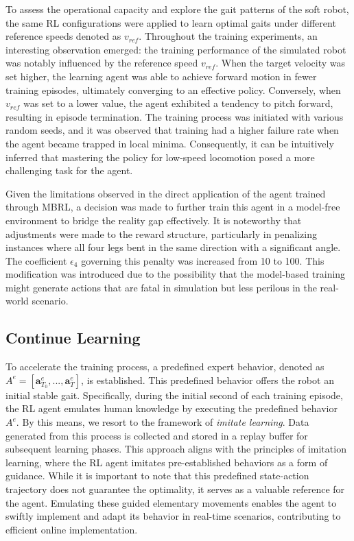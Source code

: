 To assess the operational capacity and explore the gait patterns of the soft robot, the same RL configurations were applied to learn optimal gaits under different reference speeds denoted as $v_{ref}$. Throughout the training experiments, an interesting observation emerged: the training performance of the simulated robot was notably influenced by the reference speed $v_{ref}$. When the target velocity was set higher, the learning agent was able to achieve forward motion in fewer training episodes, ultimately converging to an effective policy. Conversely, when $v_{ref}$ was set to a lower value, the agent exhibited a tendency to pitch forward, resulting in episode termination. The training process was initiated with various random seeds, and it was observed that training had a higher failure rate when the agent became trapped in local minima. Consequently, it can be intuitively inferred that mastering the policy for low-speed locomotion posed a more challenging task for the agent.

Given the limitations observed in the direct application of the agent trained through MBRL, a decision was made to further train this agent in a model-free environment to bridge the reality gap effectively. It is noteworthy that adjustments were made to the reward structure, particularly in penalizing instances where all four legs bent in the same direction with a significant angle. The coefficient $\epsilon_4$ governing this penalty was increased from 10 to 100. This modification was introduced due to the possibility that the model-based training might generate actions that are fatal in simulation but less perilous in the real-world scenario.

\subsection{Continue Learning}
To accelerate the training process, a predefined expert behavior, denoted as $A^e = [\textbf{a}_{T_0}^e, ..., \textbf{a}_T^e]$, is established\cite{jiSynthesizingOptimalGait2022}. This predefined behavior offers the robot an initial stable gait. Specifically, during the initial second of each training episode, the RL agent emulates human knowledge by executing the predefined behavior $A^e$. By this means, we resort to the framework of \textit{imitate learning}\cite{koberImitationReinforcementLearning2010}. Data generated from this process is collected and stored in a replay buffer for subsequent learning phases. This approach aligns with the principles of imitation learning, where the RL agent imitates pre-established behaviors as a form of guidance. While it is important to note that this predefined state-action trajectory does not guarantee the optimality, it serves as a valuable reference for the agent. Emulating these guided elementary movements enables the agent to swiftly implement and adapt its behavior in real-time scenarios, contributing to efficient online implementation. 

